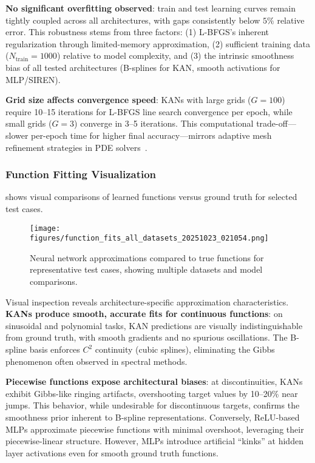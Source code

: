 \documentclass[11pt,a4paper]{article}
\begin{document}
\textbf{No significant overfitting observed}: train and test learning curves remain tightly coupled across all architectures, with gaps consistently below $5\%$ relative error. This robustness stems from three factors: (1) L-BFGS's inherent regularization through limited-memory approximation, (2) sufficient training data ($N_{\text{train}} = 1000$) relative to model complexity, and (3) the intrinsic smoothness bias of all tested architectures (B-splines for KAN, smooth activations for MLP/SIREN).

\textbf{Grid size affects convergence speed}: KANs with large grids ($G = 100$) require 10--15 iterations for L-BFGS line search convergence per epoch, while small grids ($G = 3$) converge in 3--5 iterations. This computational trade-off—slower per-epoch time for higher final accuracy—mirrors adaptive mesh refinement strategies in PDE solvers~\citep{huang2011adaptive}.

\subsubsection{Function Fitting Visualization}

 shows visual comparisons of learned functions versus ground truth for selected test cases.

\begin{figure}[htbp]
\centering
\texttt{[image: figures/function\_fits\_all\_datasets\_20251023\_021054.png]}
\caption{Neural network approximations compared to true functions for representative test cases, showing multiple datasets and model comparisons.}
\label{fig:s11_fits}
\end{figure}

Visual inspection reveals architecture-specific approximation characteristics. \textbf{KANs produce smooth, accurate fits for continuous functions}: on sinusoidal and polynomial tasks, KAN predictions are visually indistinguishable from ground truth, with smooth gradients and no spurious oscillations. The B-spline basis enforces $C^2$ continuity (cubic splines), eliminating the Gibbs phenomenon often observed in spectral methods.

\textbf{Piecewise functions expose architectural biases}: at discontinuities, KANs exhibit Gibbs-like ringing artifacts, overshooting target values by 10--20\% near jumps. This behavior, while undesirable for discontinuous targets, confirms the smoothness prior inherent to B-spline representations. Conversely, ReLU-based MLPs approximate piecewise functions with minimal overshoot, leveraging their piecewise-linear structure. However, MLPs introduce artificial ``kinks'' at hidden layer activations even for smooth ground truth functions.
\end{document}
